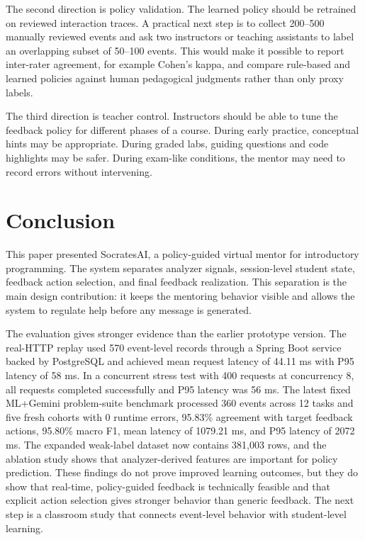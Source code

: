 \documentclass[11pt]{article}
\begin{document}
The second direction is policy validation. The learned policy should be retrained on reviewed interaction traces. A practical next step is to collect 200--500 manually reviewed events and ask two instructors or teaching assistants to label an overlapping subset of 50--100 events. This would make it possible to report inter-rater agreement, for example Cohen's kappa, and compare rule-based and learned policies against human pedagogical judgments rather than only proxy labels.

The third direction is teacher control. Instructors should be able to tune the feedback policy for different phases of a course. During early practice, conceptual hints may be appropriate. During graded labs, guiding questions and code highlights may be safer. During exam-like conditions, the mentor may need to record errors without intervening.

\section{Conclusion}

This paper presented SocratesAI, a policy-guided virtual mentor for introductory programming. The system separates analyzer signals, session-level student state, feedback action selection, and final feedback realization. This separation is the main design contribution: it keeps the mentoring behavior visible and allows the system to regulate help before any message is generated.

The evaluation gives stronger evidence than the earlier prototype version. The real-HTTP replay used 570 event-level records through a Spring Boot service backed by PostgreSQL and achieved mean request latency of 44.11 ms with P95 latency of 58 ms. In a concurrent stress test with 400 requests at concurrency 8, all requests completed successfully and P95 latency was 56 ms. The latest fixed ML+Gemini problem-suite benchmark processed 360 events across 12 tasks and five fresh cohorts with 0 runtime errors, 95.83\% agreement with target feedback actions, 95.80\% macro F1, mean latency of 1079.21 ms, and P95 latency of 2072 ms. The expanded weak-label dataset now contains 381,003 rows, and the ablation study shows that analyzer-derived features are important for policy prediction. These findings do not prove improved learning outcomes, but they do show that real-time, policy-guided feedback is technically feasible and that explicit action selection gives stronger behavior than generic feedback. The next step is a classroom study that connects event-level behavior with student-level learning.

\nocite{Francisco2022}
\nocite{Chrysafiadi2022}
\nocite{pankiewicz2023largelanguagemodelsgpt}
\nocite{AutomatedAssessmentToolsForGrading2022}
\nocite{AdaptiveImmediateFeedbackforBlockBasedProgramming}
\nocite{FeedbackSystemSupportingStudents2022}
\nocite{EvaluationofLLMtoolsforfeedbackgeneration}
\nocite{AutomatingHumanTutorStyleProgrammingFeedback}
\nocite{AITutoringinSDEducation}
\nocite{AutomatedGradingandFeedbackToolsforProgrammingEducationSystematicReview}
{\footnotesize


}
\end{document}

